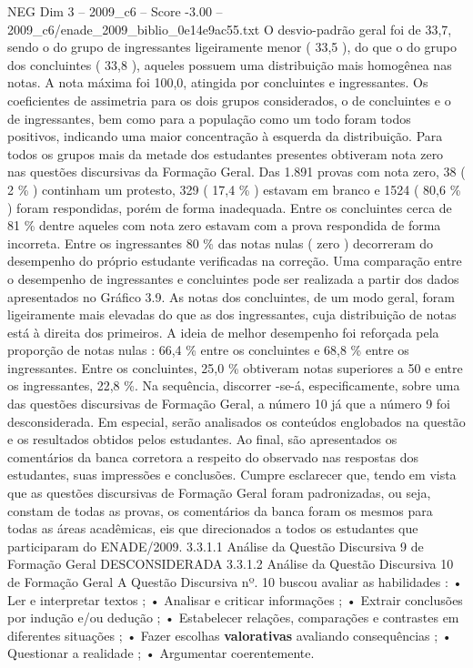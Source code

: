\begin{textsample}{NEG Dim 3 – 2009\_c6 – Score -3.00 – 2009\_c6/enade\_2009\_biblio\_0e14e9ac55.txt}
O desvio-padrão geral foi de 33,7, sendo o do grupo de ingressantes ligeiramente menor ( 33,5 ), do que o do grupo dos concluintes ( 33,8 ), aqueles possuem uma distribuição mais homogênea nas notas.
A nota máxima foi 100,0, atingida por concluintes e ingressantes.
Os coeficientes de assimetria para os dois grupos considerados, o de concluintes e o de ingressantes, bem como para a população como um todo foram todos positivos, indicando uma maior concentração à esquerda da distribuição.
Para todos os grupos mais da metade dos estudantes presentes obtiveram nota zero nas questões discursivas da Formação Geral.
Das 1.891 provas com nota zero, 38 ( 2 \% ) continham um protesto, 329 ( 17,4 \% ) estavam em branco e 1524 ( 80,6 \% ) foram respondidas, porém de forma inadequada.
Entre os concluintes cerca de 81 \% dentre aqueles com nota zero estavam com a prova respondida de forma incorreta.
Entre os ingressantes 80 \% das notas nulas ( zero ) decorreram do desempenho do próprio estudante verificadas na correção.
Uma comparação entre o desempenho de ingressantes e concluintes pode ser realizada a partir dos dados apresentados no Gráfico 3.9.
As notas dos concluintes, de um modo geral, foram ligeiramente mais elevadas do que as dos ingressantes, cuja distribuição de notas está à direita dos primeiros.
A ideia de melhor desempenho foi reforçada pela proporção de notas nulas : 66,4 \% entre os concluintes e 68,8 \% entre os ingressantes.
Entre os concluintes, 25,0 \% obtiveram notas superiores a 50 e entre os ingressantes, 22,8 \%.
Na sequência, discorrer -se-á, especificamente, sobre uma das questões discursivas de Formação Geral, a número 10 já que a número 9 foi desconsiderada.
Em especial, serão analisados os conteúdos englobados na questão e os resultados obtidos pelos estudantes.
Ao final, são apresentados os comentários da banca corretora a respeito do observado nas respostas dos estudantes, suas impressões e conclusões.
Cumpre esclarecer que, tendo em vista que as questões discursivas de Formação Geral foram padronizadas, ou seja, constam de todas as provas, os comentários da banca foram os mesmos para todas as áreas acadêmicas, eis que direcionados a todos os estudantes que participaram do ENADE/2009. 3.3.1.1 Análise da Questão Discursiva 9 de Formação Geral DESCONSIDERADA 3.3.1.2 Análise da Questão Discursiva 10 de Formação Geral A Questão Discursiva nº. 10 buscou avaliar as habilidades : • Ler e interpretar textos ; • Analisar e criticar informações ; • Extrair conclusões por indução e/ou dedução ; • Estabelecer relações, comparações e contrastes em diferentes situações ; • Fazer escolhas \textbf{valorativas} avaliando consequências ; • Questionar a realidade ; • Argumentar coerentemente.

\end{textsample}
